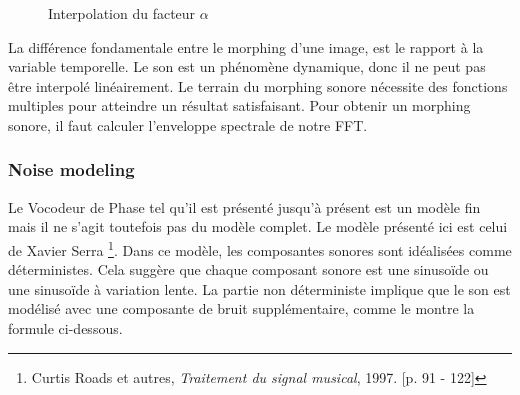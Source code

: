     \begin{figure}
        \caption{Interpolation du facteur $\alpha $}
        \label{alpha_interp}
    \end{figure}
        

La différence fondamentale entre le morphing d’une image, est le rapport à la variable temporelle. Le son est un phénomène dynamique, donc il ne peut pas être interpolé linéairement. Le terrain du morphing sonore nécessite des fonctions multiples pour atteindre un résultat satisfaisant. Pour obtenir un morphing sonore, il faut calculer l’enveloppe spectrale de notre FFT.

\subsubsection{Noise modeling}

Le Vocodeur de Phase tel qu'il est présenté jusqu'à présent est un modèle fin mais il ne s'agit toutefois pas du modèle complet. Le modèle présenté ici est celui de Xavier Serra \footnote{Curtis Roads et autres, \textit{Traitement du signal musical}, 1997. [p. 91 - 122] \nocite{Roads97}}. Dans ce modèle, les composantes sonores sont idéalisées comme déterministes. Cela suggère que chaque composant sonore est une sinusoïde ou une sinusoïde à variation lente. La partie non déterministe implique que le son est modélisé avec une composante de bruit supplémentaire, comme le montre la formule ci-dessous.

